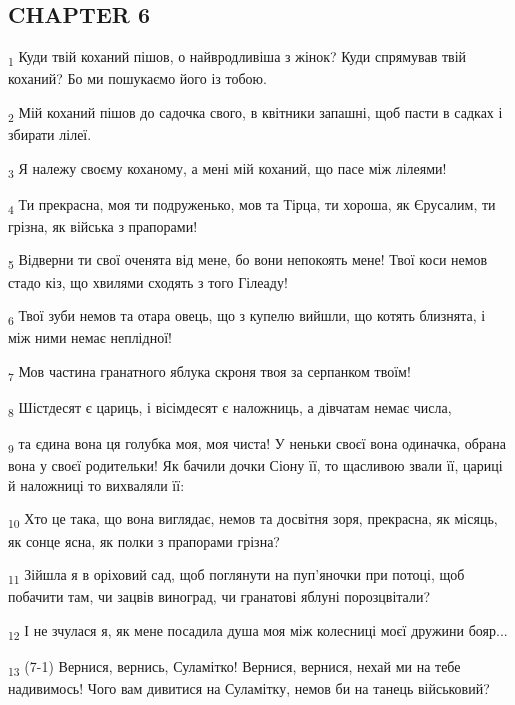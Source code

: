\subsection{CHAPTER 6}
\begin{tcolorbox}
\textsubscript{1} Куди твій коханий пішов, о найвродливіша з жінок? Куди спрямував твій коханий? Бо ми пошукаємо його із тобою.
\end{tcolorbox}
\begin{tcolorbox}
\textsubscript{2} Мій коханий пішов до садочка свого, в квітники запашні, щоб пасти в садках і збирати лілеї.
\end{tcolorbox}
\begin{tcolorbox}
\textsubscript{3} Я належу своєму коханому, а мені мій коханий, що пасе між лілеями!
\end{tcolorbox}
\begin{tcolorbox}
\textsubscript{4} Ти прекрасна, моя ти подруженько, мов та Тірца, ти хороша, як Єрусалим, ти грізна, як війська з прапорами!
\end{tcolorbox}
\begin{tcolorbox}
\textsubscript{5} Відверни ти свої оченята від мене, бо вони непокоять мене! Твої коси немов стадо кіз, що хвилями сходять з того Гілеаду!
\end{tcolorbox}
\begin{tcolorbox}
\textsubscript{6} Твої зуби немов та отара овець, що з купелю вийшли, що котять близнята, і між ними немає неплідної!
\end{tcolorbox}
\begin{tcolorbox}
\textsubscript{7} Мов частина гранатного яблука скроня твоя за серпанком твоїм!
\end{tcolorbox}
\begin{tcolorbox}
\textsubscript{8} Шістдесят є цариць, і вісімдесят є наложниць, а дівчатам немає числа,
\end{tcolorbox}
\begin{tcolorbox}
\textsubscript{9} та єдина вона ця голубка моя, моя чиста! У неньки своєї вона одиначка, обрана вона у своєї родительки! Як бачили дочки Сіону її, то щасливою звали її, цариці й наложниці то вихваляли її:
\end{tcolorbox}
\begin{tcolorbox}
\textsubscript{10} Хто це така, що вона виглядає, немов та досвітня зоря, прекрасна, як місяць, як сонце ясна, як полки з прапорами грізна?
\end{tcolorbox}
\begin{tcolorbox}
\textsubscript{11} Зійшла я в оріховий сад, щоб поглянути на пуп'яночки при потоці, щоб побачити там, чи зацвів виноград, чи гранатові яблуні порозцвітали?
\end{tcolorbox}
\begin{tcolorbox}
\textsubscript{12} І не зчулася я, як мене посадила душа моя між колесниці моєї дружини бояр...
\end{tcolorbox}
\begin{tcolorbox}
\textsubscript{13} (7-1) Вернися, вернись, Суламітко! Вернися, вернися, нехай ми на тебе надивимось! Чого вам дивитися на Суламітку, немов би на танець військовий?
\end{tcolorbox}
